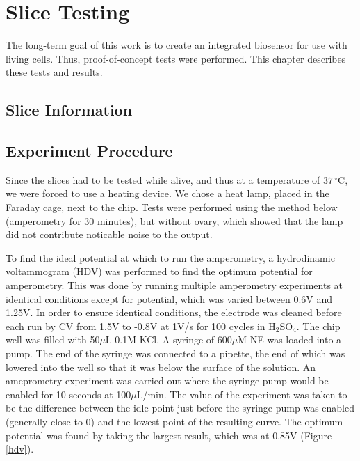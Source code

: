 \chapter{Slice Testing}

The long-term goal of this work is to create an integrated biosensor for use with living cells. Thus, proof-of-concept tests were performed. This chapter describes these tests and results.

\section{Slice Information}

\section{Experiment Procedure}

Since the slices had to be tested while alive, and thus at a temperature of $37\,^{\circ}\mathrm{C}$, we were forced to use a heating device. We chose a heat lamp, placed in the Faraday cage, next to the chip. Tests were performed using the method below (amperometry for 30 minutes), but without ovary, which showed that the lamp did not contribute noticable noise to the output.

To find the ideal potential at which to run the amperometry, a hydrodinamic voltammogram (HDV) was performed to find the optimum potential for amperometry. This was done by running multiple amperometry experiments at identical conditions except for potential, which was varied between 0.6V and 1.25V. In order to ensure identical conditions, the electrode was cleaned before each run by CV from 1.5V to -0.8V at 1V/s for 100 cycles in $\mathrm{H}_2 \mathrm{SO}_4$. The chip well was filled with 50$\mu$L 0.1M KCl. A syringe of 600$\mu$M NE was loaded into a pump. The end of the syringe was connected to a pipette, the end of which was lowered into the well so that it was below the surface of the solution. An ameprometry experiment was carried out where the syringe pump would be enabled for 10 seconds at 100$\mu$L/min. The value of the experiment was taken to be the difference between the idle point just before the syringe pump was enabled (generally close to 0) and the lowest point of the resulting curve. The optimum potential was found by taking the largest result, which was at 0.85V (Figure \ref{hdv}).

